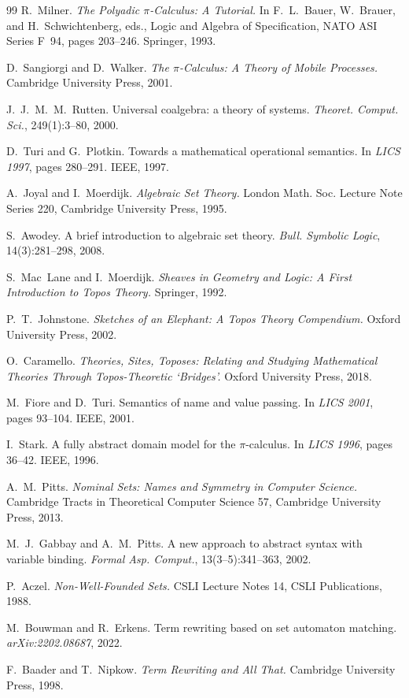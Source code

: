 \documentclass[11pt]{article}
\theoremstyle{plain}
\theoremstyle{definition}
\theoremstyle{remark}
\begin{document}
\begin{thebibliography}{99}
 R.~Milner. \emph{The Polyadic $\pi$-Calculus: A Tutorial.} In F.~L.~Bauer,
W.~Brauer, and H.~Schwichtenberg, eds., Logic and Algebra of Specification, NATO ASI Series F~94,
pages 203--246. Springer, 1993.

 D.~Sangiorgi and D.~Walker. \emph{The $\pi$-Calculus: A Theory of Mobile
Processes.} Cambridge University Press, 2001.

 J.~J.~M.~M.~Rutten. Universal coalgebra: a theory of systems. \emph{Theoret. Comput.
Sci.}, 249(1):3--80, 2000.

 D.~Turi and G.~Plotkin. Towards a mathematical operational semantics. In
\emph{LICS 1997}, pages 280--291. IEEE, 1997.

 A.~Joyal and I.~Moerdijk. \emph{Algebraic Set Theory.} London Math. Soc. Lecture Note
Series 220, Cambridge University Press, 1995.

 S.~Awodey. A brief introduction to algebraic set theory. \emph{Bull. Symbolic
Logic}, 14(3):281--298, 2008.

 S.~Mac~Lane and I.~Moerdijk. \emph{Sheaves in Geometry and Logic: A First
Introduction to Topos Theory.} Springer, 1992.

 P.~T.~Johnstone. \emph{Sketches of an Elephant: A Topos Theory Compendium.} Oxford
University Press, 2002.

 O.~Caramello. \emph{Theories, Sites, Toposes: Relating and Studying Mathematical
Theories Through Topos-Theoretic `Bridges'.} Oxford University Press, 2018.

 M.~Fiore and D.~Turi. Semantics of name and value passing. In \emph{LICS 2001},
pages 93--104. IEEE, 2001.

 I.~Stark. A fully abstract domain model for the $\pi$-calculus. In \emph{LICS 1996},
pages 36--42. IEEE, 1996.

 A.~M.~Pitts. \emph{Nominal Sets: Names and Symmetry in Computer Science.} Cambridge
Tracts in Theoretical Computer Science 57, Cambridge University Press, 2013.

 M.~J.~Gabbay and A.~M.~Pitts. A new approach to abstract syntax with variable
binding. \emph{Formal Asp. Comput.}, 13(3--5):341--363, 2002.

 P.~Aczel. \emph{Non-Well-Founded Sets.} CSLI Lecture Notes 14, CSLI Publications,
1988.

 M.~Bouwman and R.~Erkens. Term rewriting based on set automaton matching.
\emph{arXiv:2202.08687}, 2022.

 F.~Baader and T.~Nipkow. \emph{Term Rewriting and All That.} Cambridge
University Press, 1998.

\end{thebibliography}
\end{document}
